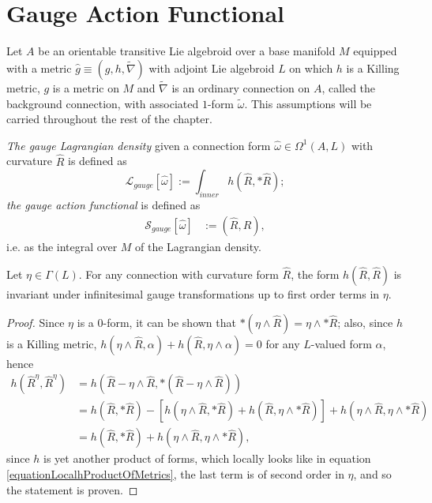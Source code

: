 \section{Gauge Action Functional}
\label{chGaugeSectionGaugeAction}

Let $A$ be an orientable transitive Lie algebroid over a base manifold $M$ equipped with a metric $\hat g \equiv (g, h, \tilde \nabla)$ with adjoint Lie algebroid $L$ on which $h$ is a Killing metric, $g$ is a metric on $M$ and $\tilde \nabla$ is an ordinary connection on $A$, called the background connection, with associated $1$-form $\tilde \omega$. This assumptions will be carried throughout the rest of the chapter.

\begin{definition}\label{definitionGaugeActionLagrangian}
\emph{The gauge Lagrangian density} given a connection form $\hat \omega \in \Omega^1(A, L)$ with curvature $\hat R$ is defined as
\begin{equation}
    \mathcal L_{gauge}[\hat \omega] := \int_{inner} h(\hat R, *\hat R);
\end{equation}
\emph{the gauge action functional} is defined as 
\begin{align}
    \mathcal S_{gauge}[\hat \omega]& := (\hat R, \hat R),
\end{align}
i.e. as the integral over $M$ of the Lagrangian density.
\end{definition}

\begin{lemma}\label{lemmaIntegrationFOrmGaugeActionTHeoryhRRisInvariantGaugeTransforamtions}
Let $\eta \in \Gamma(L)$. For any connection with curvature form $\hat R$, the form $h(\hat R, \hat R)$ is invariant under infinitesimal gauge transformations up to first order terms in $\eta$.
\end{lemma}
\begin{proof}
Since $\eta$ is a $0$-form, it can be shown that $*(\eta \wedge \hat R) = \eta \wedge *\hat R$; also, since $h$ is a Killing metric, $h(\eta \wedge \hat R, \alpha) + h(\hat R, \eta \wedge \alpha) = 0$ for any $L$-valued form $\alpha$, hence
\begin{align*}
    h(\hat R^\eta, \hat R^\eta) 
        &=h( \hat R - \eta \wedge \hat R, *(\hat R - \eta \wedge \hat R)) \\
        &= h(\hat R, *\hat R) - [h(\eta \wedge \hat R, *\hat R) + h(\hat R, \eta \wedge *\hat R)] + h(\eta \wedge \hat R, \eta \wedge *\hat R)\\
        &= h(\hat R, *\hat R) + h(\eta \wedge \hat R, \eta \wedge *\hat R),
\end{align*}
since $h$ is yet another product of forms, which locally looks like in equation \eqref{equationLocalhProductOfMetrics}, the last term is of second order in $\eta$, and so the statement is proven.
\end{proof}

